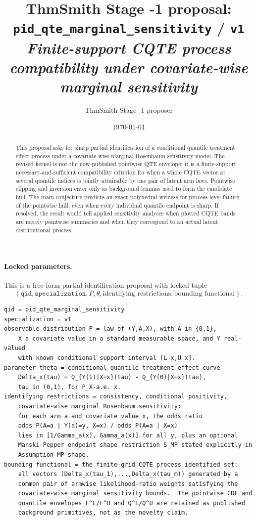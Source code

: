 \documentclass[11pt]{article}
\title{ThmSmith Stage -1 proposal: \texttt{pid\_qte\_marginal\_sensitivity} / \texttt{v1}%
  \\ \large\textit{Finite-support CQTE process compatibility under covariate-wise marginal sensitivity}}
\author{ThmSmith Stage -1 proposer}
\date{\today}
\theoremstyle{definition}
\theoremstyle{plain}
\theoremstyle{remark}
\begin{document}
\maketitle


\paragraph{Locked parameters.}
This is a free-form partial-identification proposal with locked tuple
\[
(\texttt{qid},\texttt{specialization},P,\theta,\text{identifying restrictions},\text{bounding functional}).
\]
\begin{verbatim}
qid = pid_qte_marginal_sensitivity
specialization = v1
observable distribution P = law of (Y,A,X), with A in {0,1},
    X a covariate value in a standard measurable space, and Y real-valued
    with known conditional support interval [L_x,U_x].
parameter theta = conditional quantile treatment effect curve
    Delta_x(tau) = Q_{Y(1)|X=x}(tau) - Q_{Y(0)|X=x}(tau),
    tau in (0,1), for P_X-a.e. x.
identifying restrictions = consistency, conditional positivity,
    covariate-wise marginal Rosenbaum sensitivity:
    for each arm a and covariate value x, the odds ratio
    odds P(A=a | Y(a)=y, X=x) / odds P(A=a | X=x)
    lies in [1/Gamma_a(x), Gamma_a(x)] for all y, plus an optional
    Manski-Pepper endpoint shape restriction S_MP stated explicitly in
    Assumption MP-shape.
bounding functional = the finite-grid CQTE process identified set:
    all vectors (Delta_x(tau_1),...,Delta_x(tau_m)) generated by a
    common pair of armwise likelihood-ratio weights satisfying the
    covariate-wise marginal sensitivity bounds.  The pointwise CDF and
    quantile envelopes F^L/F^U and Q^L/Q^U are retained as published
    background primitives, not as the novelty claim.
\end{verbatim}

\begin{abstract}
This proposal asks for sharp partial identification of a conditional quantile treatment effect process under a covariate-wise marginal Rosenbaum sensitivity model.  The revised kernel is not the now-published pointwise QTE envelope; it is a finite-support necessary-and-sufficient compatibility criterion for when a whole CQTE vector at several quantile indices is jointly attainable by one pair of latent arm laws.  Pointwise clipping and inversion enter only as background lemmas used to form the candidate hull.  The main conjecture predicts an exact polyhedral witness for process-level failure of the pointwise hull, even when every individual quantile endpoint is sharp.  If resolved, the result would tell applied sensitivity analyses when plotted CQTE bands are merely pointwise summaries and when they correspond to an actual latent distributional process.
\end{abstract}
\end{document}
